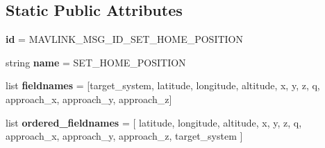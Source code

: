 \subsection*{Static Public Attributes}
\begin{DoxyCompactItemize}
\item 
\mbox{\label{classpymavlink_1_1dialects_1_1v10_1_1MAVLink__set__home__position__message_ae7069e13b05be2e81efcf698694618b3}} 
{\bfseries id} = M\+A\+V\+L\+I\+N\+K\+\_\+\+M\+S\+G\+\_\+\+I\+D\+\_\+\+S\+E\+T\+\_\+\+H\+O\+M\+E\+\_\+\+P\+O\+S\+I\+T\+I\+ON
\item 
\mbox{\label{classpymavlink_1_1dialects_1_1v10_1_1MAVLink__set__home__position__message_a1251493cacc182225719a38a36d732fe}} 
string {\bfseries name} = \textquotesingle{}S\+E\+T\+\_\+\+H\+O\+M\+E\+\_\+\+P\+O\+S\+I\+T\+I\+ON\textquotesingle{}
\item 
\mbox{\label{classpymavlink_1_1dialects_1_1v10_1_1MAVLink__set__home__position__message_ab359fb5666a9033e7e83512b12ed8491}} 
list {\bfseries fieldnames} = \mbox{[}\textquotesingle{}target\+\_\+system\textquotesingle{}, \textquotesingle{}latitude\textquotesingle{}, \textquotesingle{}longitude\textquotesingle{}, \textquotesingle{}altitude\textquotesingle{}, \textquotesingle{}x\textquotesingle{}, \textquotesingle{}y\textquotesingle{}, \textquotesingle{}z\textquotesingle{}, \textquotesingle{}q\textquotesingle{}, \textquotesingle{}approach\+\_\+x\textquotesingle{}, \textquotesingle{}approach\+\_\+y\textquotesingle{}, \textquotesingle{}approach\+\_\+z\textquotesingle{}\mbox{]}
\item 
\mbox{\label{classpymavlink_1_1dialects_1_1v10_1_1MAVLink__set__home__position__message_ad972354825778d7793972cfacd12a675}} 
list {\bfseries ordered\+\_\+fieldnames} = \mbox{[} \textquotesingle{}latitude\textquotesingle{}, \textquotesingle{}longitude\textquotesingle{}, \textquotesingle{}altitude\textquotesingle{}, \textquotesingle{}x\textquotesingle{}, \textquotesingle{}y\textquotesingle{}, \textquotesingle{}z\textquotesingle{}, \textquotesingle{}q\textquotesingle{}, \textquotesingle{}approach\+\_\+x\textquotesingle{}, \textquotesingle{}approach\+\_\+y\textquotesingle{}, \textquotesingle{}approach\+\_\+z\textquotesingle{}, \textquotesingle{}target\+\_\+system\textquotesingle{} \mbox{]}

\end{DoxyCompactItemize}
